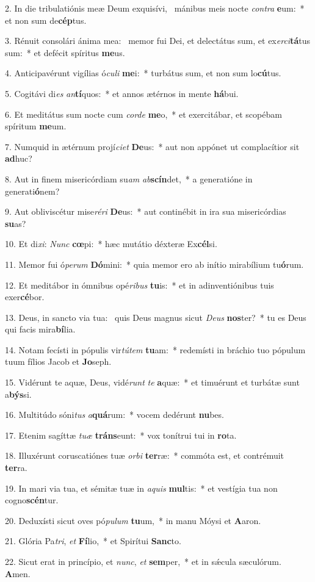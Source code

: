 2. In die tribulatiónis meæ Deum exquisívi, \dag\  mánibus meis nocte \textit{con}\textit{tra} \textbf{e}um:~*  et non sum de\textbf{cép}tus.\

3. Rénuit consolári ánima mea: \dag\  memor fui Dei, et delectátus sum, et ex\textit{er}\textit{ci}\textbf{tá}tus sum:~*  et defécit spíritus \textbf{me}us.\

4. Anticipavérunt vigílias ó\textit{cu}\textit{li} \textbf{me}i:~*  turbátus sum, et non sum lo\textbf{cú}tus.\

5. Cogitávi di\textit{es} \textit{an}\textbf{tí}quos:~*  et annos ætérnos in mente \textbf{há}bui.\

6. Et meditátus sum nocte cum \textit{cor}\textit{de} \textbf{me}o,~*  et exercitábar, et scopébam spíritum \textbf{me}um.\

7. Numquid in ætérnum projí\textit{ci}\textit{et} \textbf{De}us:~*  aut non appónet ut complacítior sit \textbf{ad}huc?\

8. Aut in finem misericórdiam su\textit{am} \textit{ab}\textbf{scín}det,~*  a generatióne in generati\textbf{ó}nem?\

9. Aut obliviscétur mise\textit{ré}\textit{ri} \textbf{De}us:~*  aut continébit in ira sua misericórdias \textbf{su}as?\

10. Et di\textit{xi}: \textit{Nunc} \textbf{cœ}pi:~*  hæc mutátio déxteræ Ex\textbf{cél}si.\

11. Memor fui ó\textit{pe}\textit{rum} \textbf{Dó}mini:~*  quia memor ero ab inítio mirabílium tu\textbf{ó}rum.\

12. Et meditábor in ómnibus opé\textit{ri}\textit{bus} \textbf{tu}is:~*  et in adinventiónibus tuis exer\textbf{cé}bor.\

13. Deus, in sancto via tua: \dag\  quis Deus magnus sicut \textit{De}\textit{us} \textbf{nos}ter?~*  tu es Deus qui facis mira\textbf{bí}lia.\

14. Notam fecísti in pópulis vir\textit{tú}\textit{tem} \textbf{tu}am:~*  redemísti in bráchio tuo pópulum tuum fílios Jacob et \textbf{Jo}seph.\

15. Vidérunt te aquæ, Deus, vidé\textit{runt} \textit{te} \textbf{a}quæ:~*  et timuérunt et turbátæ sunt a\textbf{býs}si.\

16. Multitúdo sóni\textit{tus} \textit{a}\textbf{quá}rum:~*  vocem dedérunt \textbf{nu}bes.\

17. Etenim sagíttæ \textit{tu}\textit{æ} \textbf{tráns}eunt:~*  vox tonítrui tui in \textbf{ro}ta.\

18. Illuxérunt coruscatiónes tuæ \textit{or}\textit{bi} \textbf{ter}ræ:~*  commóta est, et contrémuit \textbf{ter}ra.\

19. In mari via tua, et sémitæ tuæ in \textit{a}\textit{quis} \textbf{mul}tis:~*  et vestígia tua non cogno\textbf{scén}tur.\

20. Deduxísti sicut oves pó\textit{pu}\textit{lum} \textbf{tu}um,~*  in manu Móysi et \textbf{A}aron.\

21. Glória Pa\textit{tri}, \textit{et} \textbf{Fí}lio,~*  et Spirítui \textbf{Sanc}to.\

22. Sicut erat in princípio, et \textit{nunc}, \textit{et} \textbf{sem}per,~*  et in sǽcula sæculórum. \textbf{A}men.\

